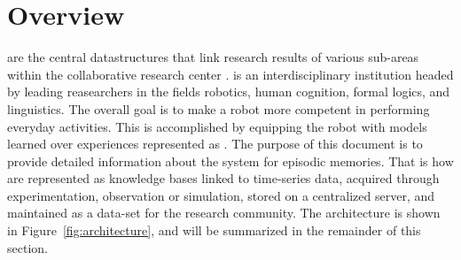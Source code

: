 \section{Overview}
\label{sec:overview}

\neems are the central datastructures that link research results of various sub-areas within the collaborative research center \ease.
\ease is an interdisciplinary institution headed by leading reasearchers in the fields robotics, human cognition, formal logics, and linguistics.
The overall goal is to make a robot more competent in performing everyday activities.
This is accomplished by equipping the robot with models learned over experiences represented as \neems.
The purpose of this document is to provide detailed information about the \ease system for episodic memories.
That is how \neems are
represented as knowledge bases linked to time-series data,
acquired through experimentation, observation or simulation,
stored on a centralized server, and
maintained as a data-set for the research community.
The architecture is shown in Figure~\ref{fig:architecture}, and will be summarized in the remainder of this section.

\lipsum[4]

\lipsum[4]

\lipsum[4]

